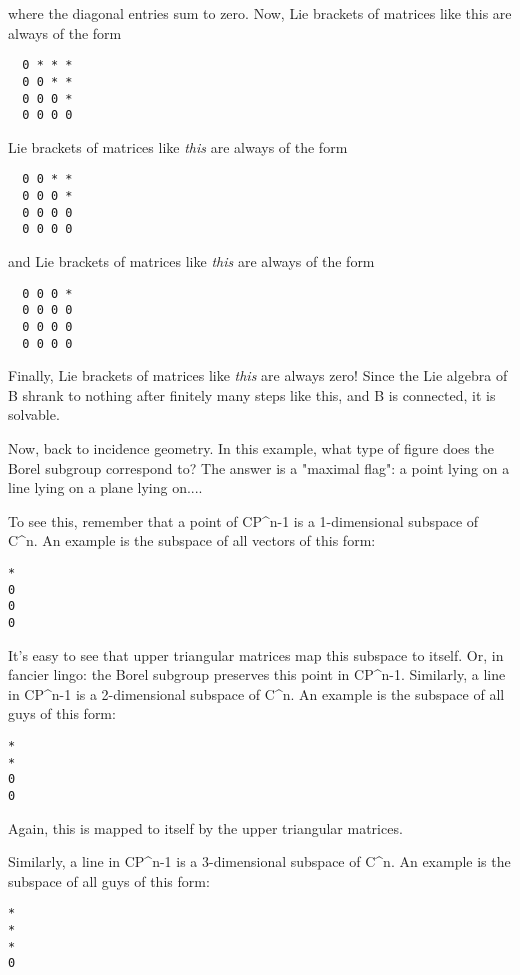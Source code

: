where the diagonal entries sum to zero.  Now, Lie brackets of matrices 
like this are always of the form

\begin{verbatim}
  0 * * *
  0 0 * *
  0 0 0 *
  0 0 0 0
\end{verbatim}
    
Lie brackets of matrices like \emph{this} are always of the form

\begin{verbatim}
  0 0 * *
  0 0 0 *
  0 0 0 0
  0 0 0 0
\end{verbatim}
    
and Lie brackets of matrices like \emph{this} are always of the form

\begin{verbatim}
  0 0 0 *
  0 0 0 0
  0 0 0 0
  0 0 0 0
\end{verbatim}
    
Finally, Lie brackets of matrices like \emph{this} are always zero!
Since the Lie algebra of B shrank to nothing after finitely many steps
like this, and B is connected, it is solvable.


Now, back to incidence geometry.  In this example, what type of figure
does the Borel subgroup correspond to?  The answer is a "maximal
flag": a point lying on a line lying on a plane lying on....

To see this, remember that a point of CP^{n-1} is a 1-dimensional
subspace of C^{n}.  An example is the subspace of all vectors of this
form:

\begin{verbatim}
*
0
0
0
\end{verbatim}
    
It's easy to see that upper triangular matrices map this subspace
to itself.  Or, in fancier lingo: the Borel subgroup preserves 
this point in CP^{n-1}.  
Similarly, a line in CP^{n-1} is a 2-dimensional subspace of
C^{n}.  An example is the subspace of all guys of this form:

\begin{verbatim}
*
*
0
0
\end{verbatim}
    
Again, this is mapped to itself by the upper triangular matrices.

Similarly, a line in CP^{n-1} is a 3-dimensional subspace of
C^{n}.  An example is the subspace of all guys of this form:

\begin{verbatim}
*
*
*
0
\end{verbatim}
    
